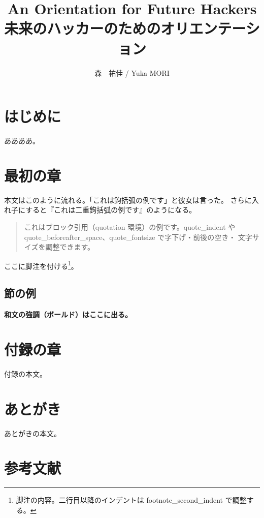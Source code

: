 \documentclass[
  book,                 %
  paper=a5,              %
  fontsize=10.5pt,       %
  jafontsize=10.5pt,     %
  twoside,
  openright,             %
  hanging_punctuation,   %
  open_bracket_pos=zenkakunibu_nibu,
]{jlreq}
\title{\sffamily An Orientation for Future Hackers\\未来のハッカーのためのオリエンテーション}
\author{\sffamily 森　祐佳 / Yuka MORI}
\date{\sffamily 2026}
\begin{document}
\frontmatter
{\color{accentcolor}\maketitle}

\chapter*{はじめに}

ああああ。

\tableofcontents

\mainmatter
\chapter{最初の章}

本文はこのように流れる。「これは鉤括弧の例です」と彼女は言った。
さらに入れ子にすると『これは二重鉤括弧の例です』のようになる。

\begin{quotation}
これはブロック引用（quotation 環境）の例です。quote\_indent や
quote\_beforeafter\_space、quote\_fontsize で字下げ・前後の空き・
文字サイズを調整できます。
\end{quotation}

ここに脚注を付ける\footnote{脚注の内容。二行目以降のインデントは
footnote\_second\_indent で調整する。}。

\section{節の例}

\textbf{和文の強調（ボールド）はここに出る。}

\appendix
\chapter{付録の章}
 
付録の本文。

\backmatter
\chapter*{あとがき}
 
あとがきの本文。
 
\chapter*{参考文献}
\end{document}
